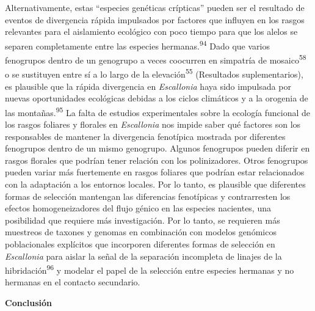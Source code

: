 \documentclass[
  11pt,
]{article}
\begin{document}
Alternativamente, estas ``especies genéticas crípticas'' pueden ser el resultado de eventos de divergencia rápida impulsados por factores que influyen en los rasgos relevantes para el aislamiento ecológico con poco tiempo para que los alelos se separen completamente entre las especies hermanas.\textsuperscript{94} Dado que varios fenogrupos dentro de un genogrupo a veces coocurren en simpatría de mosaico\textsuperscript{58} o se sustituyen entre sí a lo largo de la elevación\textsuperscript{55} (Resultados suplementarios), es plausible que la rápida divergencia en \emph{Escallonia} haya sido impulsada por nuevas oportunidades ecológicas debidas a los ciclos climáticos y a la orogenia de las montañas.\textsuperscript{95} La falta de estudios experimentales sobre la ecología funcional de los rasgos foliares y florales en \emph{Escallonia} nos impide saber qué factores son los responsables de mantener la divergencia fenotípica mostrada por diferentes fenogrupos dentro de un mismo genogrupo. Algunos fenogrupos pueden diferir en rasgos florales que podrían tener relación con los polinizadores. Otros fenogrupos pueden variar más fuertemente en rasgos foliares que podrían estar relacionados con la adaptación a los entornos locales. Por lo tanto, es plausible que diferentes formas de selección mantengan las diferencias fenotípicas y contrarresten los efectos homogeneizadores del flujo génico en las especies nacientes, una posibilidad que requiere más investigación. Por lo tanto, se requieren más muestreos de taxones y genomas en combinación con modelos genómicos poblacionales explícitos que incorporen diferentes formas de selección en \emph{Escallonia} para aislar la señal de la separación incompleta de linajes de la hibridación\textsuperscript{96} y modelar el papel de la selección entre especies hermanas y no hermanas en el contacto secundario.

\textbf{Conclusión}
\end{document}
